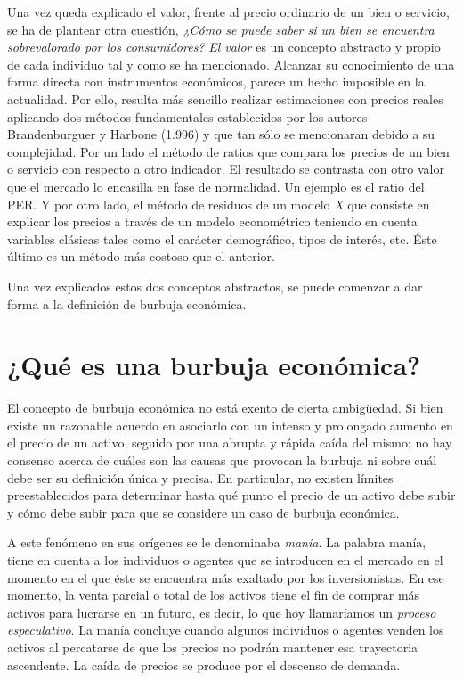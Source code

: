 Una vez queda explicado el valor, frente al precio ordinario de un bien o servicio, se ha de plantear otra cuestión, \emph{¿Cómo se puede saber si un bien se encuentra sobrevalorado por los consumidores?} \emph{El valor} es un concepto abstracto y propio de cada individuo tal y como se ha mencionado. Alcanzar su conocimiento de una forma directa con instrumentos económicos, parece un hecho imposible en la actualidad. Por ello, resulta más sencillo realizar estimaciones con precios reales aplicando dos métodos fundamentales establecidos por los autores Brandenburguer y Harbone (1.996) y que tan sólo se mencionaran debido a su complejidad. Por un lado el método de ratios que compara los precios de un bien o servicio con respecto a otro indicador. El resultado se contrasta con otro valor que el mercado lo encasilla en fase de normalidad. Un ejemplo es el ratio del PER. Y por otro lado, el método de residuos de un modelo \emph{X} que consiste en explicar los precios a través de un modelo econométrico teniendo en cuenta variables clásicas tales como el carácter demográfico, tipos de interés, etc. Éste último es un método más costoso que el anterior.

Una vez explicados estos dos conceptos abstractos, se puede comenzar a dar forma a la definición de burbuja económica. 

\section{¿Qué es una burbuja económica?}

El concepto de burbuja económica no está exento de cierta ambigüedad. Si bien existe un razonable acuerdo en asociarlo con un intenso y prolongado aumento en el precio de un activo, seguido por una abrupta y rápida caída del mismo; no hay consenso acerca de cuáles son las causas que provocan la burbuja ni sobre cuál debe ser su definición única y precisa. En particular, no existen límites preestablecidos para determinar hasta qué punto el precio de un activo debe subir y cómo debe subir para que se considere un caso de burbuja económica. 

A este fenómeno en sus orígenes se le denominaba  \emph{manía}. La palabra manía, tiene en cuenta a los individuos o agentes que se introducen en el mercado en el momento en el que éste se encuentra más exaltado por los inversionistas. En ese momento, la venta parcial o total de los activos tiene el fin de comprar más activos para lucrarse en un futuro, es decir, lo que hoy llamaríamos un \emph{proceso especulativo}. La manía concluye cuando algunos individuos o agentes venden los activos al percatarse de que los precios no podrán mantener esa trayectoria ascendente. La caída de precios se produce por el descenso de demanda.

